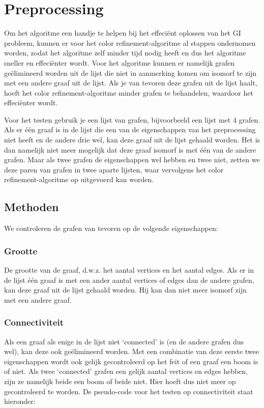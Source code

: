 \documentclass{article}
\begin{document}

\section{Preprocessing}
Om het algoritme een handje te helpen bij het effeciënt oplossen van het GI probleem, kunnen er voor het color refinement-algoritme al stappen ondernomen worden, zodat het algoritme zelf minder tijd nodig heeft en dus het algoritme sneller en effeciënter wordt.
Voor het algoritme kunnen er namelijk grafen geëlimineerd worden uit de lijst die niet in aanmerking komen om isomorf te zijn met een andere graaf uit de lijst. Als je van tevoren deze grafen uit de lijst haalt, hoeft het color refinement-algoritme minder grafen te behandelen, waardoor het effeciënter wordt.

Voor het testen gebruik je een lijst van grafen, bijvoorbeeld een lijst met 4 grafen. Als er \'e\'en graaf is in de lijst die een van de eigenschappen van het preprocessing niet heeft en de andere drie wel, kan deze graaf uit de lijst gehaald worden. Het is dan namelijk niet meer mogelijk dat deze graaf isomorf is met \'e\'en van de andere grafen. Maar als twee grafen de eigenschappen wel hebben en twee niet, zetten we deze paren van grafen in twee aparte lijsten, waar vervolgens het color refinement-algoritme op uitgevoerd kan worden.

\subsection{Methoden}
We controleren de grafen van tevoren op de volgende eigenschappen:
\subsubsection{Grootte}
De grootte van de graaf, d.w.z. het aantal vertices en het aantal edges. Als er in de lijst één graaf is met een ander aantal vertices of edges dan de andere grafen, kan deze graaf uit de lijst gehaald worden. Hij kan dan niet meer isomorf zijn met een andere graaf.
\subsubsection{Connectiviteit}
Als een graaf als enige in de lijst niet ‘connected’ is (en de andere grafen dus wel), kan deze ook geëlimineerd worden. Met een combinatie van deze eerste twee eigenschappen wordt ook gelijk gecontroleerd op het feit of een graaf een boom is of niet. Als twee ‘connected’ grafen een gelijk aantal vertices en edges hebben, zijn ze namelijk beide een boom of beide niet. Hier hoeft dus niet meer op gecontroleerd te worden. De pseudo-code voor het testen op connectiviteit staat hieronder:\\
\end{document}
